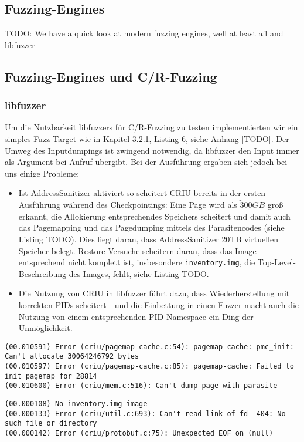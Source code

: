 \documentclass[a4paper]{article}
\begin{document}
\subsection{Fuzzing-Engines}
TODO: We have a quick look at modern fuzzing engines, well at least afl and libfuzzer\\
\subsection{Fuzzing-Engines und C/R-Fuzzing}
\subsubsection{libfuzzer}
Um die Nutzbarkeit libfuzzers für C/R-Fuzzing zu testen implementierten wir ein simples Fuzz-Target wie in Kapitel 3.2.1, Listing 6, siehe Anhang [TODO]. Der Umweg des Inputdumpings ist zwingend notwendig, da libfuzzer den Input immer als Argument bei Aufruf übergibt. Bei der Ausführung ergaben sich jedoch bei uns einige Probleme:
\begin{itemize}
    \item Ist AddressSanitizer aktiviert so scheitert CRIU bereits in der ersten Ausführung während des Checkpointings: Eine Page wird als $\tilde 300GB$ groß erkannt, die Allokierung entsprechendes Speichers scheitert und damit auch das Pagemapping und das Pagedumping mittels des Parasitencodes (siehe Listing TODO). Dies liegt daran, dass AddressSanitizer 20TB virtuellen Speicher belegt. Restore-Versuche scheitern daran, dass das Image entsprechend nicht komplett ist, insbesondere \texttt{inventory.img}, die Top-Level-Beschreibung des Images, fehlt, siehe Listing TODO.
    \item Die Nutzung von CRIU in libfuzzer führt dazu, dass Wiederherstellung mit korrekten PIDs scheitert - und die Einbettung in einen Fuzzer macht auch die Nutzung von einem entsprechenden PID-Namespace ein Ding der Unmöglichkeit.
\end{itemize}
\begin{lstlisting}[caption=Pagemapping/dumping Errors mit ASan]
(00.010591) Error (criu/pagemap-cache.c:54): pagemap-cache: pmc_init: Can't allocate 30064246792 bytes
(00.010597) Error (criu/pagemap-cache.c:85): pagemap-cache: Failed to init pagemap for 28814
(00.010600) Error (criu/mem.c:516): Can't dump page with parasite
\end{lstlisting}
\begin{lstlisting}[caption=Restoring Error mit ASan]
(00.000108) No inventory.img image
(00.000133) Error (criu/util.c:693): Can't read link of fd -404: No such file or directory
(00.000142) Error (criu/protobuf.c:75): Unexpected EOF on (null)
\end{lstlisting}
\end{document}
